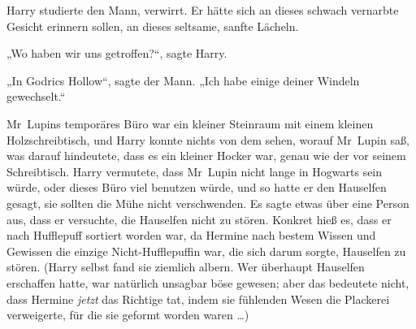 Harry studierte den Mann, verwirrt. Er hätte sich an dieses schwach vernarbte Gesicht erinnern sollen, an dieses seltsame, sanfte Lächeln.

„Wo haben wir uns getroffen?“, sagte Harry.

„In Godrics Hollow“, sagte der Mann.
„Ich habe einige deiner Windeln gewechselt.“

\later

Mr~Lupins temporäres Büro war ein kleiner Steinraum mit einem kleinen Holzschreibtisch, und Harry konnte nichts von dem sehen, worauf Mr~Lupin saß, was darauf hindeutete, dass es ein kleiner Hocker war, genau wie der vor seinem Schreibtisch. Harry vermutete, dass Mr~Lupin nicht lange in Hogwarts sein würde, oder dieses Büro viel benutzen würde, und so hatte er den Hauselfen gesagt, sie sollten die Mühe nicht verschwenden. Es sagte etwas über eine Person aus, dass er versuchte, die Hauselfen nicht zu stören. Konkret hieß es, dass er nach Hufflepuff sortiert worden war, da Hermine nach bestem Wissen und Gewissen die einzige Nicht-Hufflepuffin war, die sich darum sorgte, Hauselfen zu stören. (Harry selbst fand sie ziemlich albern. Wer überhaupt Hauselfen erschaffen hatte, war natürlich unsagbar böse gewesen; aber das bedeutete nicht, dass Hermine \emph{jetzt} das Richtige tat, indem sie fühlenden Wesen die Plackerei verweigerte, für die sie geformt worden waren …)

